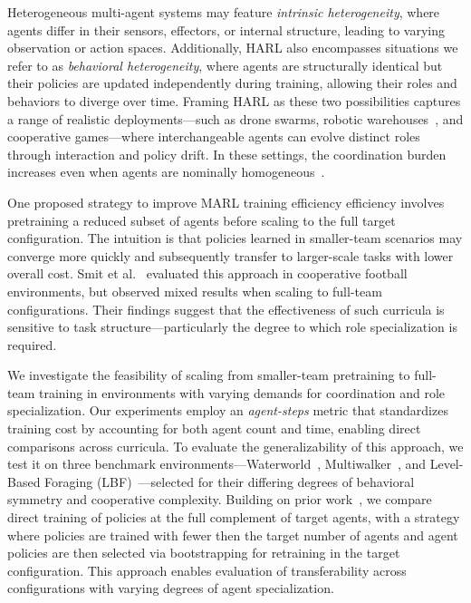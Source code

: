 \documentclass{article}
\begin{document}
Heterogeneous multi-agent systems may feature \emph{intrinsic heterogeneity}, 
where agents differ in their sensors, effectors, or internal structure, 
leading to varying observation or action spaces. Additionally, 
HARL also encompasses situations we refer to as \emph{behavioral heterogeneity}, 
where agents are structurally identical but their policies are updated independently 
during training, allowing their roles and behaviors to diverge over time. 
Framing HARL as these two possibilities
%
captures a range of realistic deployments—such as drone swarms, 
robotic warehouses~\cite{rizk2019}, and cooperative games—where interchangeable 
agents can evolve distinct roles through interaction and policy drift. 
In these settings, the coordination burden increases even when agents are 
nominally homogeneous~\cite{shoham2007,ackermann2019}.

One proposed strategy to improve MARL training efficiency efficiency involves pretraining 
a reduced subset of agents before scaling to the full target configuration. 
The intuition is that policies learned in smaller-team scenarios may converge 
more quickly and subsequently transfer to larger-scale tasks with lower overall cost. 
Smit et al.~\cite{smit2023} evaluated this approach in cooperative football environments, 
but observed mixed results when scaling to full-team configurations. Their findings 
suggest that the effectiveness of such curricula is sensitive to task structure—particularly 
the degree to which role specialization is required.

We investigate the feasibility of scaling from smaller-team pretraining to full-team 
training in environments with varying demands for coordination and role specialization.
Our experiments employ an \emph{agent-steps} metric that standardizes training cost by 
accounting for both agent count and time, enabling direct comparisons across curricula. 
To evaluate the generalizability of this approach, we test it on three benchmark 
environments—Waterworld~\cite{gupta2017}, Multiwalker~\cite{gupta2017}, 
and Level-Based Foraging (LBF)~\cite{papoudakis2021}—selected for their 
differing degrees of behavioral symmetry and cooperative complexity. 
Building on prior work~\cite{smit2023}, we compare 
direct training of policies at the full complement of target agents, with a strategy 
where policies are trained with fewer then the target number of agents and agent 
policies are then selected via bootstrapping for retraining in the target configuration.
This approach enables evaluation of transferability across configurations with 
varying degrees of agent specialization.
\end{document}

